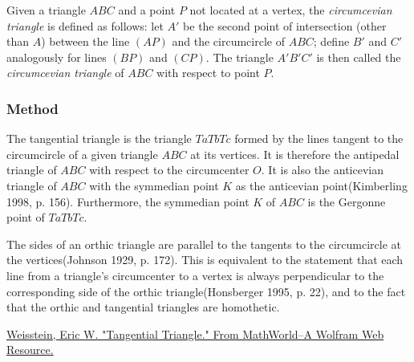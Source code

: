 Given a triangle $ABC$ and a point $P$ not located at a vertex, the \emph{circumcevian triangle} is defined as follows: let $A'$ be the second point of intersection (other than $A$) between the line $(AP)$ and the circumcircle of $ABC$; define $B'$ and $C'$ analogously for lines $(BP)$ and $(CP)$. The triangle $A'B'C'$ is then called the \emph{circumcevian triangle} of $ABC$ with respect to point $P$.

\vspace{1em}

\begin{tkzexample}[latex=6cm]
\begin{center}
\end{center}

\end{tkzexample}

\subsubsection{Method } %
\label{ssub:method_triangle_tangential}

The tangential triangle is the triangle $TaTbTc$ formed by the lines tangent to the circumcircle of a given triangle $ABC$ at its vertices. It is therefore the antipedal triangle of $ABC$ with respect to the circumcenter $O$. It is also the anticevian triangle of $ABC$ with the symmedian point $K$ as the anticevian point(Kimberling 1998, p. 156). Furthermore, the symmedian point $K$ of $ABC$ is the Gergonne point of $TaTbTc$.

The sides of an orthic triangle are parallel to the tangents to the circumcircle at the vertices(Johnson 1929, p. 172). This is equivalent to the statement that each line from a triangle's circumcenter to a vertex is always perpendicular to the corresponding side of the orthic triangle(Honsberger 1995, p. 22), and to the fact that the orthic and tangential triangles are homothetic.\begin{flushright}
  \small
\href{https://mathworld.wolfram.com/TangentialTriangle.html}{Weisstein, Eric W. "Tangential Triangle." From MathWorld--A Wolfram Web Resource.}
\end{flushright}

